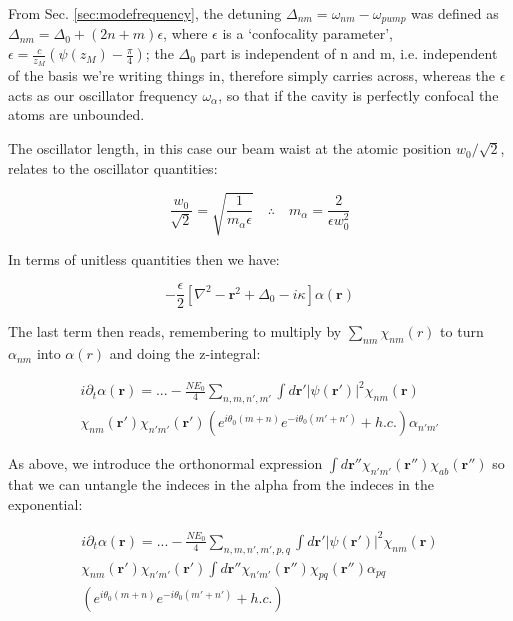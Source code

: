 \documentclass[a4paper,twocolumn,nobalancelastpage]{revtex4-1}
\begin{document}
From Sec. \ref{sec:modefrequency}, the detuning $\Delta_{nm}=\omega_{nm}-\omega_{pump}$ was defined as $\Delta_{nm}=\Delta_0+(2n+m)\epsilon$, where $\epsilon$ is a `confocality parameter', $\epsilon= \frac{c}{z_M}\left(\psi(z_M)-\frac{\pi}{4}\right)$; the $\Delta_0$ part is independent of n and m, i.e. independent of the basis we're writing things in, therefore simply carries across, whereas the $\epsilon$ acts as our oscillator frequency $\omega_{\alpha}$, so that if the cavity is perfectly confocal the atoms are unbounded.

The oscillator length, in this case our beam waist at the atomic position $ w_0 / \sqrt{2}$, relates to the oscillator quantities:

\begin{equation}
\frac{w_0}{\sqrt{2}}=\sqrt{\frac{1}{m_{\alpha} \epsilon}} \quad \therefore \quad m_{\alpha}=\frac{2}{\epsilon w_0^2}
\end{equation}

In terms of unitless quantities then we have:

\begin{equation}
-\frac{\epsilon}{2} \left[ \nabla^2 - \textbf{r}^2 + \Delta_0 -i\kappa \right] \alpha(\textbf{r})
\end{equation}

The last term then reads, remembering to multiply by $\sum_{nm} \chi_{nm}(r)$ to turn $\alpha_{nm}$ into $\alpha(r)$ and doing the z-integral:

\begin{multline}
i\partial_t \alpha(\textbf{r})= ... - \frac{N E_0}{4}
\sum_{n,m,n',m'} \int d\textbf{r}' |\psi(\textbf{r}')|^2 \chi_{nm} (\textbf{r}) \\
\chi_{nm} (\textbf{r}') \chi_{n'm'}(\textbf{r}')  
\left(e^{i\theta_0(m+n)}e^{-i\theta_0(m'+n')}+h.c. \right) \alpha_{n'm'}
\end{multline}

As above, we introduce the orthonormal expression $\int d\textbf{r}'' \chi_{n'm'}(\textbf{r}'') \chi_{ab}(\textbf{r}'')$ so that we can untangle the indeces in the alpha from the indeces in the exponential:

\begin{multline}
i\partial_t \alpha(\textbf{r})= ... - \frac{N E_0}{4}
\sum_{n,m,n',m',p,q} \int d\textbf{r}' |\psi(\textbf{r}')|^2 \chi_{nm} (\textbf{r}) \\
\chi_{nm} (\textbf{r}') \chi_{n'm'}(\textbf{r}')  \int d\textbf{r}'' \chi_{n'm'}(\textbf{r}'') \chi_{pq} (\textbf{r}'') \alpha_{pq} \\
\left(e^{i\theta_0(m+n)}e^{-i\theta_0(m'+n')}+h.c. \right) 
\end{multline}
\end{document}
